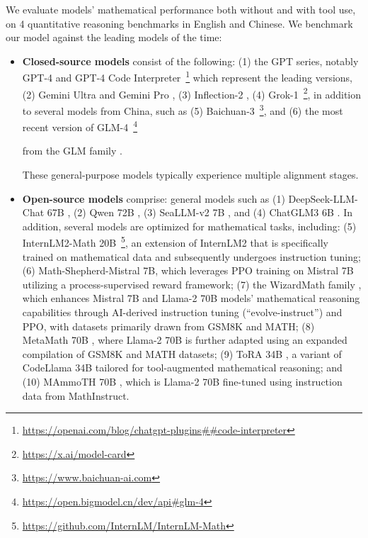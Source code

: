 \begin{itemize}[topsep=0pt]
We evaluate models' mathematical performance both without and with tool use, on 4 quantitative reasoning benchmarks in English and Chinese. We benchmark our model against the leading models of the time:

\begin{itemize}[topsep=0pt]
    \item \textbf{Closed-source models} consist of the following: (1) the GPT series, notably GPT-4 \citep{gpt4} and GPT-4 Code Interpreter~\footnote{\url{https://openai.com/blog/chatgpt-plugins\#\#code-interpreter}} which represent the leading versions, (2) Gemini Ultra and Gemini Pro \citep{gemini}, (3) Inflection-2 \citep{inflection-2}, (4) Grok-1~\footnote{\url{https://x.ai/model-card}},
    in addition to several models from China, such as (5) Baichuan-3~\footnote{\url{https://www.baichuan-ai.com}},
    and (6) the most recent version of GLM-4~\footnote{\url{https://open.bigmodel.cn/dev/api\#glm-4}}

    from the GLM family \citep{glm}.

These general-purpose models typically experience multiple alignment stages.

\item \textbf{Open-source models} comprise: general models such as (1) DeepSeek-LLM-Chat 67B \citep{deepseek-llm}, (2) Qwen 72B \citep{qwen}, (3) SeaLLM-v2 7B \citep{seallm}, and (4) ChatGLM3 6B \citep{chatglm3}. In addition, several models are optimized for mathematical tasks, including: (5) InternLM2-Math 20B~\footnote{\url{https://github.com/InternLM/InternLM-Math}}, an extension of InternLM2 that is specifically trained on mathematical data and subsequently undergoes instruction tuning; (6) Math-Shepherd-Mistral 7B, which leverages PPO training \citep{schulman2017proximal} on Mistral 7B \citep{mistral} utilizing a process-supervised reward framework; (7) the WizardMath family \citep{wizardmath}, which enhances Mistral 7B and Llama-2 70B \citep{llama2} models’ mathematical reasoning capabilities through AI-derived instruction tuning (“evolve-instruct”) and PPO, with datasets primarily drawn from GSM8K and MATH; (8) MetaMath 70B \citep{metamath}, where Llama-2 70B is further adapted using an expanded compilation of GSM8K and MATH datasets; (9) ToRA 34B \cite{tora}, a variant of CodeLlama 34B tailored for tool-augmented mathematical reasoning; and (10) MAmmoTH 70B \citep{MathInstruct}, which is Llama-2 70B fine-tuned using instruction data from MathInstruct.


\end{itemize}
\end{itemize}
